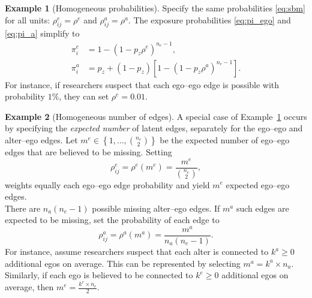 \documentclass[11pt]{article}
\theoremstyle{definition}
\newtheorem{exmp}{Example}
\begin{document}
\begin{exmp}[Homogeneous probabilities]
    \label{exmp:pi_homo}
    Specify the same probabilities \eqref{eq:sbm} for all units:
    $\rho^e_{ij}=\rho^e$ and $\rho^a_{ij}=\rho^a$. 
    The exposure probabilities \eqref{eq:pi_ego} and \eqref{eq:pi_a} simplify to
    \begin{equation*}
        \begin{aligned}
            \pi_i^e &= 1 - (1-p_z\rho^e)^{n_e-1}, \\
            \pi_i^a &= p_z + (1-p_z)\left[1- (1-p_z\rho^a)^{n_e-1}\right].
        \end{aligned}
    \end{equation*}
    For instance, if researchers suspect that each ego--ego edge is possible with probability $1\%$,
    they can set $\rho^e=0.01$. 
\end{exmp}

\begin{exmp}[Homogeneous number of edges]
    \label{exmp:pi_number}
    A special case of Example~\ref{exmp:pi_homo} occurs
     by specifying the \emph{expected number} of latent edges, separately for the ego--ego and alter--ego edges. 
    Let $m^e \in \left\{1,\ldots, \binom{n_e}{2}\right\}$ be the expected number of ego--ego edges
     that are believed to be missing. Setting 
    \begin{equation*}
        \rho^e_{ij} = \rho^e(m^e) = \frac{m^e}{\binom{n_e}{2}},
    \end{equation*}
    weights equally each ego--ego edge probability and yield $m^e$ expected ego--ego edges.
    \\
    There are $n_a(n_e-1)$ possible missing alter--ego edges. 
     If $m^a$ such edges are expected to be missing, set the probability of each edge to
    \begin{equation*}
        \rho^a_{ij} = \rho^a(m^a) = \frac{m^a}{n_a(n_e-1)}.
    \end{equation*} 
    For instance, assume researchers suspect that each alter 
    is connected to $k^a \geq 0$ additional egos on average.
    This can be represented by selecting $m^a = k^a \times n_a$.     
    Similarly, if each ego is believed to be connected to $k^e\geq 0$ additional egos on average,
    then $m^e = \frac{k^e \times n_e}{2}$.
\end{exmp}
\end{document}
